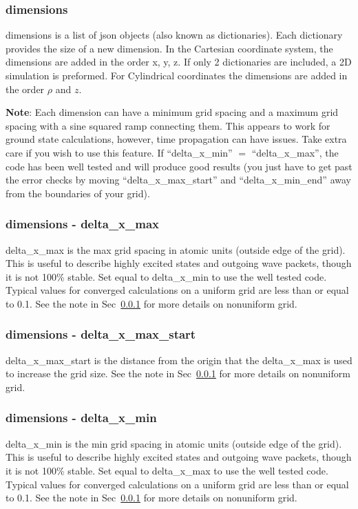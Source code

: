 \documentclass{article}
\begin{document}
\subsubsection{dimensions}
\label{ssub:dimensions}
dimensions is a list of json objects (also known as dictionaries). Each dictionary provides the size of a new dimension. In the Cartesian coordinate system, the dimensions are added in the order x, y, z. If only 2 dictionaries are included, a 2D simulation is preformed. For Cylindrical coordinates the dimensions are added in the order $\rho$ and $z$.

\textbf{Note}: Each dimension can have a minimum grid spacing and a maximum grid spacing with a sine squared ramp connecting them. This appears to work for ground state calculations, however, time propagation can have issues. Take extra care if you wish to use this feature. If ``delta\_x\_min'' $=$ ``delta\_x\_max'', the code has been well tested and will produce good results (you just have to get past the error checks by moving ``delta\_x\_max\_start'' and ``delta\_x\_min\_end'' away from the boundaries of your grid).

\subsubsection{dimensions - delta\_x\_max}
delta\_x\_max is the max grid spacing in atomic units (outside edge of the grid). This is useful to describe highly excited states and outgoing wave packets, though it is not 100\% stable. Set equal to delta\_x\_min to use the well tested code. Typical values for converged calculations on a uniform grid are less than or equal to 0.1. See the note in Sec~\ref{ssub:dimensions} for more details on nonuniform grid.

\subsubsection{dimensions - delta\_x\_max\_start}
delta\_x\_max\_start is the distance from the origin that the delta\_x\_max is used to increase the grid size. See the note in Sec~\ref{ssub:dimensions} for more details on nonuniform grid.

\subsubsection{dimensions - delta\_x\_min}
delta\_x\_min is the min grid spacing in atomic units (outside edge of the grid). This is useful to describe highly excited states and outgoing wave packets, though it is not 100\% stable. Set equal to delta\_x\_max to use the well tested code. Typical values for converged calculations on a uniform grid are less than or equal to 0.1. See the note in Sec~\ref{ssub:dimensions} for more details on nonuniform grid.
\end{document}
